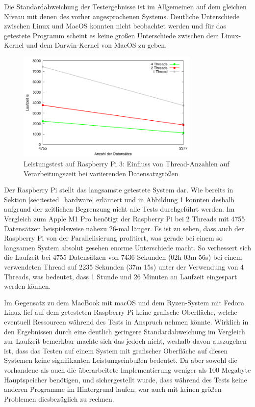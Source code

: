 Die Standardabweichung der Testergebnisse ist im Allgemeinen auf dem gleichen Niveau mit denen des vorher angesprochenen Systems. Deutliche Unterschiede zwischen Linux und MacOS konnten nicht beobachtet werden und für das getestete Programm scheint es keine großen Unterschiede zwischen dem Linux-Kernel und dem Darwin-Kernel von MacOS zu geben.

\begin{figure}[H]
\centering
\includegraphics[width=0.8\textwidth]{../results/plots/raspberrypi3/comp_all_threads.pdf}
\caption{Leistungstest auf Raspberry Pi 3: Einfluss von Thread-Anzahlen auf Verarbeitungszeit bei variierenden Datensatzgrößen}
\label{fig:raspi_benchmark_threads}
\end{figure}

Der Raspberry Pi stellt das langsamste getestete System dar. Wie bereits in Sektion \ref{sec:tested_hardware} erläutert und in Abbildung \ref{fig:raspi_benchmark_threads} konnten deshalb aufgrund der zeitlichen Begrenzung nicht alle Tests durchgeführt werden. Im Vergleich zum Apple M1 Pro benötigt der Raspberry Pi bei 2 Threads mit 4755 Datensätzen beispielsweise nahezu 26-mal länger. Es ist zu sehen, dass auch der Raspberry Pi von der Parallelisierung profitiert, was gerade bei einem so langsamen System absolut gesehen enorme Unterschiede macht. So verbessert sich die Laufzeit bei 4755 Datensätzen von 7436 Sekunden (02h 03m 56s) bei einem verwendeten Thread auf 2235 Sekunden (37m 15s) unter der Verwendung von 4 Threads, was bedeutet, dass 1 Stunde und 26 Minuten an Laufzeit eingespart werden können.

Im Gegensatz zu dem MacBook mit macOS und dem Ryzen-System mit Fedora Linux lief auf dem getesteten Raspberry Pi keine grafische Oberfläche, welche eventuell Ressourcen während des Tests in Anspruch nehmen könnte. Wirklich in den Ergebnissen durch eine deutlich geringere Standardabweichung im Vergleich zur Laufzeit bemerkbar machte sich das jedoch nicht, weshalb davon auszugehen ist, dass das Testen auf einem System mit grafischer Oberfläche auf diesen Systemen keine signifikanten Leistungseinbußen bedeutet. Da aber sowohl die vorhandene als auch die überarbeitete Implementierung weniger als 100 Megabyte Hauptspeicher benötigen, und sichergestellt wurde, dass während des Tests keine anderen Programme im Hintergrund laufen, war auch mit keinen größen Problemen diesbezüglich zu rechnen.

